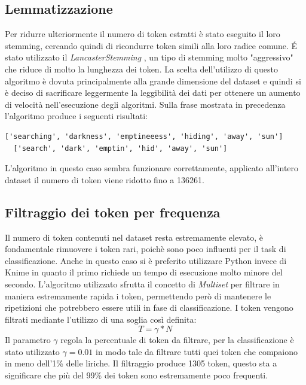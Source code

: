 \documentclass[technote]{IEEEtran}
\begin{document}
\subsection{Lemmatizzazione}
Per ridurre ulteriormente il numero di token estratti \`e stato
eseguito il loro stemming, cercando quindi di ricondurre token
simili alla loro radice comune. \'E stato utilizzato il
\textit{LancasterStemming} \cite{10.1145/101306.101310}, un tipo di stemming
molto "aggressivo" che riduce di molto la lunghezza dei token.
La scelta dell'utilizzo di questo algoritmo è dovuta principalmente alla
grande dimensione del dataset e quindi si è deciso di sacrificare leggermente la
leggibilità dei dati per ottenere un aumento di velocità nell'esecuzione degli
algoritmi. Sulla frase mostrata in precedenza l'algoritmo produce i seguenti risultati:
\begin{lstlisting}[basicstyle=\tiny]
  ['searching', 'darkness', 'emptineeess', 'hiding', 'away', 'sun']
  ['search', 'dark', 'emptin', 'hid', 'away', 'sun']
\end{lstlisting}
L'algoritmo in questo caso sembra funzionare correttamente, applicato all'intero dataset il numero di token viene ridotto fino a 136261.
\subsection{Filtraggio dei token per frequenza}
Il numero di token contenuti nel dataset resta estremamente elevato, è fondamentale rimuovere i token rari, poichè sono poco influenti per il task di classificazione.
Anche in questo caso si è preferito utilizzare Python invece
di Knime in quanto il primo richiede un tempo di esecuzione molto minore del
secondo.
L'algoritmo utilizzato sfrutta il concetto di \textit{Multiset} per
filtrare in maniera estremamente rapida i token, permettendo però di
mantenere le ripetizioni che potrebbero essere utili in fase di classificazione.
I token vengono filtrati mediante l'utilizzo di una soglia così definita:
\begin{equation}
T = \gamma * N 
\end{equation}
Il parametro $ \gamma $ regola la percentuale di token da filtrare, per
la classificazione è stato utilizzato $ \gamma = 0.01 $ in modo
tale da filtrare tutti quei token che compaiono in meno dell'1\% delle liriche.
Il filtraggio produce 1305 token, questo sta a significare che più
del 99\% dei token sono estremamente poco frequenti.
\end{document}
